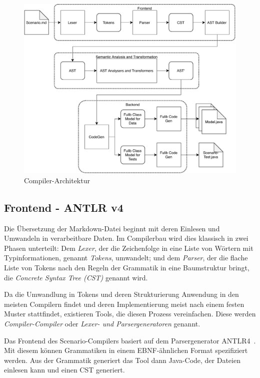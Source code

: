 \begin{figure}
    \includegraphics[width=\textwidth]{chapter/fulib-scenarios/img/architecture.pdf}
    \caption{Compiler-Architektur}
    \label{fig:compiler-architecture}
\end{figure}

\subsection{Frontend - ANTLR v4}\label{subsec:frontend-antlr4}

Die Übersetzung der Markdown-Datei beginnt mit deren Einlesen und Umwandeln in verarbeitbare Daten.
Im Compilerbau wird dies klassisch in zwei Phasen unterteilt:
Dem \emph{Lexer}, der die Zeichenfolge in eine Liste von Wörtern mit Typinformationen, genannt \emph{Tokens}, umwandelt;
und dem \emph{Parser}, der die flache Liste von Tokens nach den Regeln der Grammatik in eine Baumstruktur bringt,
die \emph{Concrete Syntax Tree (CST)} genannt wird.

Da die Umwandlung in Tokens und deren Strukturierung Anwendung in den meisten Compilern findet
und deren Implementierung meist nach einem festen Muster stattfindet,
existieren Tools, die diesen Prozess vereinfachen.
Diese werden \emph{Compiler-Compiler} oder \emph{Lexer- und Parsergeneratoren} genannt.

Das Frontend des Scenario-Compilers basiert auf dem Parsergenerator ANTLR4~\cite{antlr4-reference}.
Mit diesem können Grammatiken in einem EBNF-ähnlichen Format spezifiziert werden.
Aus der Grammatik generiert das Tool dann Java-Code, der Dateien einlesen kann und einen CST generiert.


